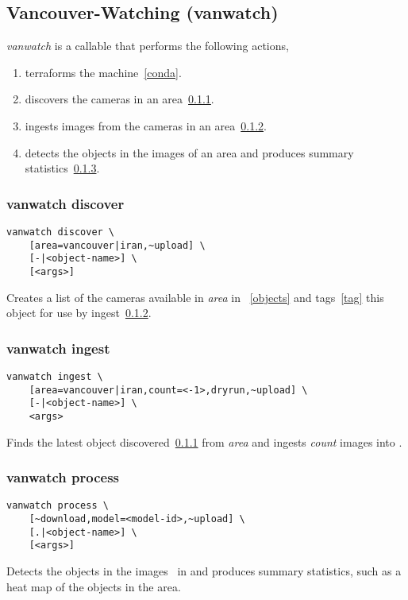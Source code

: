 \subsection{Vancouver-Watching (vanwatch)}
\label{vanwatch}

\emph{vanwatch} is a callable that performs the following actions,
%
\begin{enumerate}
    \item{terraforms the machine~\ref{conda}.}
    \item{discovers the cameras in an area~\ref{vanwatch_discover}.}
    \item{ingests images from the cameras in an area~\ref{vanwatch_ingest}.}
    \item{detects the objects in the images of an area and produces summary statistics~\ref{vanwatch_process}.}
\end{enumerate}

\subsubsection{vanwatch discover}
\label{vanwatch_discover}

\begin{verbatim}
vanwatch discover \
    [area=vancouver|iran,~upload] \
    [-|<object-name>] \
    [<args>]
\end{verbatim}
%
Creates a list of the cameras available in \emph{area} in ~\ref{objects} and tags~\ref{tag} this object for use by ingest~\ref{vanwatch_ingest}.

\subsubsection{vanwatch ingest}
\label{vanwatch_ingest}

\begin{verbatim}
vanwatch ingest \
    [area=vancouver|iran,count=<-1>,dryrun,~upload] \
    [-|<object-name>] \
    <args>
\end{verbatim}
%
Finds the latest object discovered~\ref{vanwatch_discover} from \emph{area} and ingests \emph{count} images into .

\subsubsection{vanwatch process}
\label{vanwatch_process}

\begin{verbatim}
vanwatch process \
    [~download,model=<model-id>,~upload] \
    [.|<object-name>] \
    [<args>]
\end{verbatim}
%
Detects the objects in the images~ in  and produces summary statistics, such as a heat map of the objects in the area.